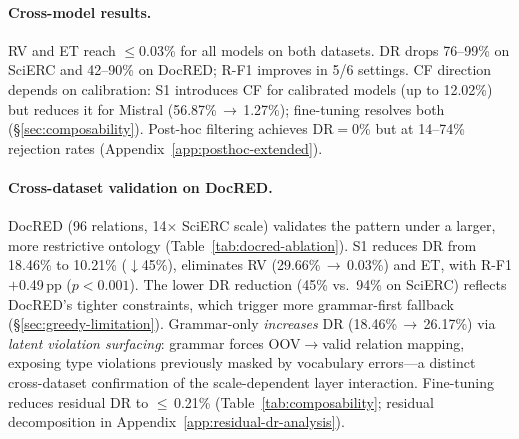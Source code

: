 \paragraph{Cross-model results.}
RV and ET reach $\leq$0.03\% for all models on both datasets.
DR drops 76--99\% on SciERC and 42--90\% on DocRED; R-F1 improves in 5/6 settings.
CF direction depends on calibration: S1 introduces CF for calibrated models (up to 12.02\%) but reduces it for Mistral (56.87\%\,$\to$\,1.27\%); fine-tuning resolves both (\S\ref{sec:composability}).
Post-hoc filtering achieves DR${=}$0\% but at 14--74\% rejection rates (Appendix~\ref{app:posthoc-extended}).

\paragraph{Cross-dataset validation on DocRED.}
\label{sec:docred-results}
DocRED (96 relations, 14$\times$ SciERC scale) validates the pattern under a larger, more restrictive ontology (Table~\ref{tab:docred-ablation}).
S1 reduces DR from 18.46\% to 10.21\% ($\downarrow$45\%), eliminates RV (29.66\%\,$\to$\,0.03\%) and ET, with R-F1 $+$0.49\,pp ($p < 0.001$).
The lower DR reduction (45\% vs.\ 94\% on SciERC) reflects DocRED's tighter constraints, which trigger more grammar-first fallback (\S\ref{sec:greedy-limitation}).
Grammar-only \emph{increases} DR (18.46\%\,$\to$\,26.17\%) via \textit{latent violation surfacing}: grammar forces OOV$\to$valid relation mapping, exposing type violations previously masked by vocabulary errors---a distinct cross-dataset confirmation of the scale-dependent layer interaction.
Fine-tuning reduces residual DR to $\leq$\,0.21\% (Table~\ref{tab:composability}; residual decomposition in Appendix~\ref{app:residual-dr-analysis}).
